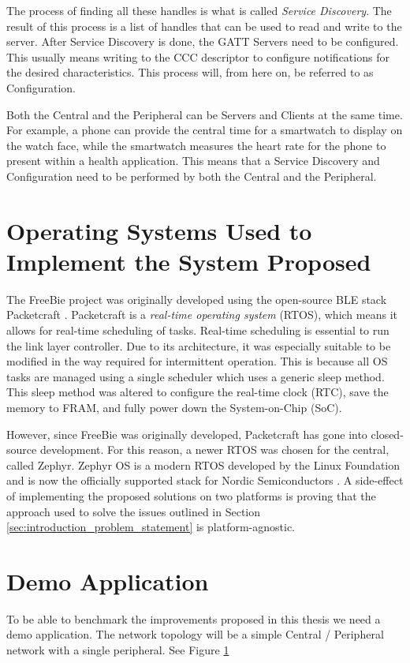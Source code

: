 The process of finding all these handles is what is called \textit{Service Discovery}. The result of this process is a list of handles that can be used to read and write to the server. After Service Discovery is done, the GATT Servers need to be configured. This usually means writing to the CCC descriptor to configure notifications for the desired characteristics. This process will, from here on, be referred to as Configuration. 

Both the Central and the Peripheral can be Servers and Clients at the same time. For example, a phone can provide the central time for a smartwatch to display on the watch face, while the smartwatch measures the heart rate for the phone to present within a health application. This means that a Service Discovery and Configuration need to be performed by both the Central and the Peripheral.

\section{Operating Systems Used to Implement the System Proposed}
The FreeBie project was originally developed using the open-source BLE stack Packetcraft \cite{packetcraft}. Packetcraft is a \textit{real-time operating system} (RTOS), which means it allows for real-time scheduling of tasks. Real-time scheduling is essential to run the link layer controller. Due to its architecture, it was especially suitable to be modified in the way required for intermittent operation. This is because all OS tasks are managed using a single scheduler which uses a generic sleep method. This sleep method was altered to configure the real-time clock (RTC), save the memory to FRAM, and fully power down the System-on-Chip (SoC).

However, since FreeBie was originally developed, Packetcraft has gone into closed-source development. For this reason, a newer RTOS was chosen for the central, called Zephyr. Zephyr OS is a modern RTOS developed by the Linux Foundation and is now the officially supported stack for Nordic Semiconductors \cite{zephyrproject}. A side-effect of implementing the proposed solutions on two platforms is proving that the approach used to solve the issues outlined in Section \ref{sec:introduction_problem_statement} is platform-agnostic.

\section{Demo Application}
\label{sec:demo_application}
To be able to benchmark the improvements proposed in this thesis we need a demo application. The network topology will be a simple Central / Peripheral network with a single peripheral. See Figure \ref{}